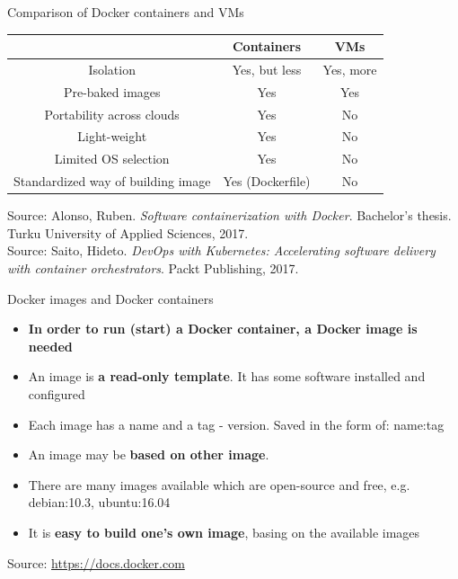 \documentclass{beamer}
\begin{document}
\begin{frame}{Comparison of Docker containers and VMs}%
\begin{center}
	\begin{flushleft}
	\begin{tabular}{@{}  | c | c | c | @{}}
		\hline
		 & \textbf{Containers} & \textbf{VMs} \\
		 \hline
		 Isolation & Yes, but less & Yes, more \\
		 \hline
		 Pre-baked images & Yes & Yes \\
		 \hline
		Portability across clouds & Yes & No \\
		\hline
		Light-weight & Yes & No \\
		\hline
		Limited OS selection & Yes & No \\
		\hline
		Standardized way of building image & Yes (Dockerfile) & No \\
		\hline
		\end{tabular}
	\end{flushleft}
\end{center}
\tiny{Source: Alonso, Ruben. \textit{Software containerization with Docker}. Bachelor's thesis. Turku University of Applied Sciences, 2017.} \\
\tiny{Source: Saito, Hideto. \textit{DevOps with Kubernetes: Accelerating software delivery with container orchestrators}. Packt Publishing, 2017.}
\end{frame}

\begin{frame}{Docker images and Docker containers}%
	\begin{itemize}
		\item \textbf{In order to run (start) a Docker container, a Docker image is needed}
		\item An image is \textbf{a read-only template}. It has some software installed and configured
		\item Each image has a name and a tag - version. Saved in the form of: name:tag
		\item An image may be \textbf{based on other image}.
		\item There are many images available which are open-source and free, e.g. debian:10.3, ubuntu:16.04
		\item It is \textbf{easy to build one's own image}, basing on the available images
	\end{itemize}
	\tiny{Source: \url{https://docs.docker.com}}
\end{frame}
\end{document}
